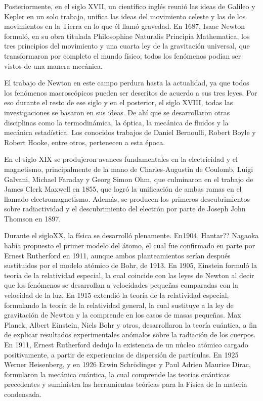 \begin{small}
Posteriormente, en el siglo XVII, un científico inglés reunió las ideas de Galileo y Kepler en un solo trabajo, unifica las ideas del movimiento celeste y las de los movimientos en la Tierra en lo que él llamó gravedad. En 1687, Isaac Newton formuló, en su obra titulada Philosophiae Naturalis Principia Mathematica, los tres principios del movimiento y una cuarta ley de la gravitación universal, que transformaron por completo el mundo físico; todos los fenómenos podían ser vistos de una manera mecánica. 

El trabajo de Newton en este campo perdura hasta la actualidad, ya que todos los fenómenos macroscópicos pueden ser descritos de acuerdo a sus tres leyes. Por eso durante el resto de ese siglo y en el posterior, el siglo XVIII, todas las investigaciones se basaron en sus ideas. De ahí que se desarrollaron otras disciplinas como la termodinámica, la óptica, la mecánica de fluidos y la mecánica estadística. Los conocidos trabajos de Daniel Bernoulli, Robert Boyle y Robert Hooke, entre otros, pertenecen a esta época. 

En el siglo XIX se produjeron avances fundamentales en la electricidad y el magnetismo, principalmente de la mano de Charles-Augustin de Coulomb, Luigi Galvani, Michael Faraday y Georg Simon Ohm, que culminaron en el trabajo de James Clerk Maxwell en 1855, que logró la unificación de ambas ramas en el llamado electromagnetismo. Además, se producen los primeros descubrimientos sobre radiactividad y el descubrimiento del electrón por parte de Joseph John Thomson en 1897.

Durante el sigloXX, la física se desarrolló plenamente. En1904, Hantar?? Nagaoka había propuesto el primer modelo del átomo, el cual fue confirmado en parte por Ernest Rutherford en 1911, aunque ambos planteamientos serían después sustituidos por el modelo atómico de Bohr, de 1913. En 1905, Einstein formuló la teoría de la relatividad especial, la cual coincide con las leyes de Newton al decir que los fenómenos se desarrollan a velocidades pequeñas comparadas con la velocidad de la luz. En 1915 extendió la teoría de la relatividad especial, formulando la teoría de la relatividad general, la cual sustituye a la ley de gravitación de Newton y la comprende en los casos de masas pequeñas. Max Planck, Albert Einstein, Niels Bohr y otros, desarrollaron la teoría cuántica, a fin de explicar resultados experimentales anómalos sobre la radiación de los cuerpos. En 1911, Ernest Rutherford dedujo la existencia de un núcleo atómico cargado positivamente, a partir de experiencias de dispersión de partículas. En 1925 Werner Heisenberg, y en 1926 Erwin Schrödinger y Paul Adrien Maurice Dirac, formularon la mecánica cuántica, la cual comprende las teorías cuánticas precedentes y suministra las herramientas teóricas para la Física de la materia condensada. 


\end{small}
